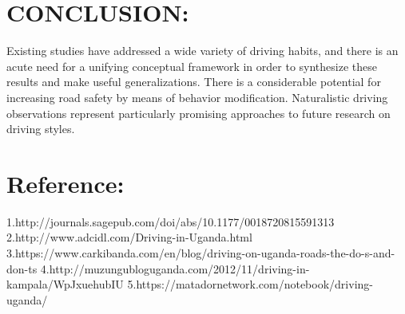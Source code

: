 \documentclass{article}                    %
\begin{document}
\section{CONCLUSION:}
 Existing studies have addressed a wide variety of driving habits, and there is an acute need for a unifying conceptual framework in order to synthesize these results and make useful generalizations. There is a considerable potential for increasing road safety by means of behavior modification. Naturalistic driving observations represent particularly promising approaches to future research on driving styles.



\newpage
\section{Reference:}
1.http://journals.sagepub.com/doi/abs/10.1177/0018720815591313
\vspace{2.00\baselineskip}
{\newline}
2.http://www.adcidl.com/Driving-in-Uganda.html
\vspace{2.00\baselineskip}
{\newline}
3.https://www.carkibanda.com/en/blog/driving-on-uganda-roads-the-do-s-and-don-ts
\vspace{2.00\baselineskip}
{\newline}
4.http://muzungubloguganda.com/2012/11/driving-in-kampala/WpJxuehubIU
\vspace{2.00\baselineskip}
{\newline}
5.https://matadornetwork.com/notebook/driving-uganda/
\end{document}
